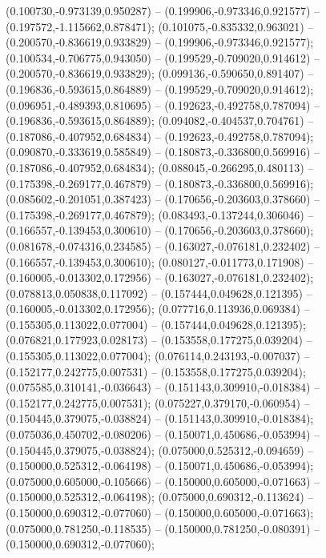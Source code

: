  (0.100730,-0.973139,0.950287) -- (0.199906,-0.973346,0.921577) -- (0.197572,-1.115662,0.878471);
 (0.101075,-0.835332,0.963021) -- (0.200570,-0.836619,0.933829) -- (0.199906,-0.973346,0.921577);
 (0.100534,-0.706775,0.943050) -- (0.199529,-0.709020,0.914612) -- (0.200570,-0.836619,0.933829);
 (0.099136,-0.590650,0.891407) -- (0.196836,-0.593615,0.864889) -- (0.199529,-0.709020,0.914612);
 (0.096951,-0.489393,0.810695) -- (0.192623,-0.492758,0.787094) -- (0.196836,-0.593615,0.864889);
 (0.094082,-0.404537,0.704761) -- (0.187086,-0.407952,0.684834) -- (0.192623,-0.492758,0.787094);
 (0.090870,-0.333619,0.585849) -- (0.180873,-0.336800,0.569916) -- (0.187086,-0.407952,0.684834);
 (0.088045,-0.266295,0.480113) -- (0.175398,-0.269177,0.467879) -- (0.180873,-0.336800,0.569916);
 (0.085602,-0.201051,0.387423) -- (0.170656,-0.203603,0.378660) -- (0.175398,-0.269177,0.467879);
 (0.083493,-0.137244,0.306046) -- (0.166557,-0.139453,0.300610) -- (0.170656,-0.203603,0.378660);
 (0.081678,-0.074316,0.234585) -- (0.163027,-0.076181,0.232402) -- (0.166557,-0.139453,0.300610);
 (0.080127,-0.011773,0.171908) -- (0.160005,-0.013302,0.172956) -- (0.163027,-0.076181,0.232402);
 (0.078813,0.050838,0.117092) -- (0.157444,0.049628,0.121395) -- (0.160005,-0.013302,0.172956);
 (0.077716,0.113936,0.069384) -- (0.155305,0.113022,0.077004) -- (0.157444,0.049628,0.121395);
 (0.076821,0.177923,0.028173) -- (0.153558,0.177275,0.039204) -- (0.155305,0.113022,0.077004);
 (0.076114,0.243193,-0.007037) -- (0.152177,0.242775,0.007531) -- (0.153558,0.177275,0.039204);
 (0.075585,0.310141,-0.036643) -- (0.151143,0.309910,-0.018384) -- (0.152177,0.242775,0.007531);
 (0.075227,0.379170,-0.060954) -- (0.150445,0.379075,-0.038824) -- (0.151143,0.309910,-0.018384);
 (0.075036,0.450702,-0.080206) -- (0.150071,0.450686,-0.053994) -- (0.150445,0.379075,-0.038824);
 (0.075000,0.525312,-0.094659) -- (0.150000,0.525312,-0.064198) -- (0.150071,0.450686,-0.053994);
 (0.075000,0.605000,-0.105666) -- (0.150000,0.605000,-0.071663) -- (0.150000,0.525312,-0.064198);
 (0.075000,0.690312,-0.113624) -- (0.150000,0.690312,-0.077060) -- (0.150000,0.605000,-0.071663);
 (0.075000,0.781250,-0.118535) -- (0.150000,0.781250,-0.080391) -- (0.150000,0.690312,-0.077060);
